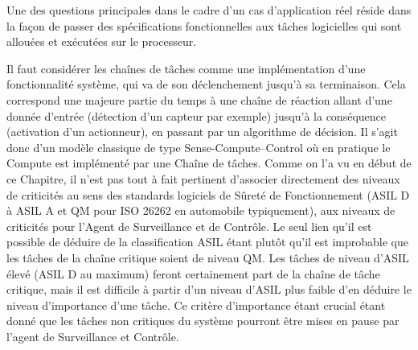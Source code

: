 \documentclass[french, a4paper, 11pt, twoside, pdftex]{StyleThese}
\begin{document}
    	
        
		Une des questions principales dans le cadre d'un cas d'application réel réside dans la façon de passer des spécifications fonctionnelles aux tâches logicielles qui sont allouées et exécutées sur le processeur.
		
		Il faut considérer les chaînes de tâches comme une implémentation d'une fonctionnalité système, qui va de son déclenchement jusqu'à sa terminaison. Cela correspond une majeure partie du temps à une chaîne de réaction allant d'une donnée d'entrée (détection d'un capteur par exemple) jusqu'à la conséquence (activation d'un actionneur), en passant par un algorithme de décision. Il s'agit donc d'un modèle classique de type Sense-Compute--Control où en pratique le Compute est implémenté par une Chaîne de tâches.
		Comme on l'a vu en début de ce Chapitre, il n'est pas tout à fait pertinent d'associer directement des niveaux de criticités au sens des standards logiciels de Sûreté de Fonctionnement (ASIL D à ASIL A et QM pour ISO 26262 en automobile typiquement), aux niveaux de criticités pour l'Agent de Surveillance et de Contrôle. Le seul lien qu'il est possible de déduire de la classification ASIL étant plutôt qu'il est improbable que les tâches de la chaîne critique soient de niveau QM. Les tâches de niveau d'ASIL élevé (ASIL D au maximum) feront certainement part de la chaîne de tâche critique, mais il est difficile à partir d'un niveau d'ASIL plus faible d'en déduire le niveau d'importance d'une tâche. Ce critère d'importance étant crucial étant donné que les tâches non critiques du système pourront être mises en pause par l'agent de Surveillance et Contrôle.
		
\end{document}
